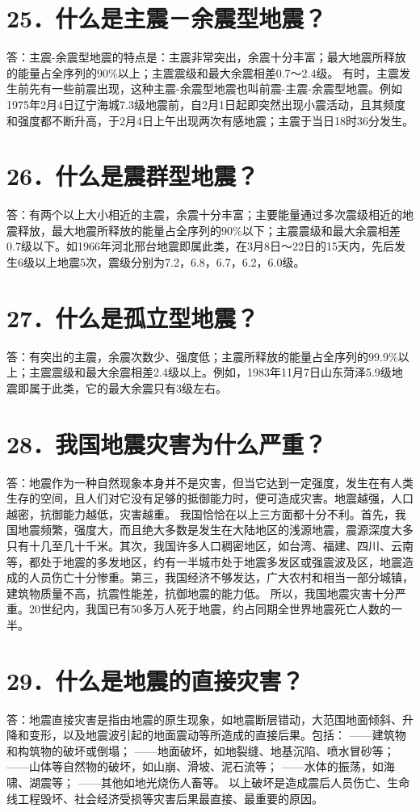 \documentclass[a4paper,12pt,english]{sphinxmanual}
\begin{document}
\section{25．什么是主震－余震型地震？}
\label{\detokenize{index:id27}}
答：主震-余震型地震的特点是：主震非常突出，余震十分丰富；最大地震所释放的能量占全序列的90\%以上；主震震级和最大余震相差0.7～2.4级。
有时，主震发生前先有一些前震出现，这种主震-余震型地震也叫前震-主震-余震型地震。例如1975年2月4日辽宁海城7.3级地震前，自2月1日起即突然出现小震活动，且其频度和强度都不断升高，于2月4日上午出现两次有感地震；主震于当日18时36分发生。


\section{26．什么是震群型地震？}
\label{\detokenize{index:id28}}
答：有两个以上大小相近的主震，余震十分丰富；主要能量通过多次震级相近的地震释放，最大地震所释放的能量占全序列的90\%以下；主震震级和最大余震相差0.7级以下。如1966年河北邢台地震即属此类，在3月8日～22日的15天内，先后发生6级以上地震5次，震级分别为7.2，6.8，6.7，6.2，6.0级。


\section{27．什么是孤立型地震？}
\label{\detokenize{index:id29}}
答：有突出的主震，余震次数少、强度低；主震所释放的能量占全序列的99.9\%以上；主震震级和最大余震相差2.4级以上。例如，1983年11月7日山东菏泽5.9级地震即属于此类，它的最大余震只有3级左右。


\section{28．我国地震灾害为什么严重？}
\label{\detokenize{index:id30}}
答：地震作为一种自然现象本身并不是灾害，但当它达到一定强度，发生在有人类生存的空间，且人们对它没有足够的抵御能力时，便可造成灾害。地震越强，人口越密，抗御能力越低，灾害越重。
我国恰恰在以上三方面都十分不利。首先，我国地震频繁，强度大，而且绝大多数是发生在大陆地区的浅源地震，震源深度大多只有十几至几十千米。其次，我国许多人口稠密地区，如台湾、福建、四川、云南等，都处于地震的多发地区，约有一半城市处于地震多发区或强震波及区，地震造成的人员伤亡十分惨重。第三，我国经济不够发达，广大农村和相当一部分城镇，建筑物质量不高，抗震性能差，抗御地震的能力低。
所以，我国地震灾害十分严重。20世纪内，我国已有50多万人死于地震，约占同期全世界地震死亡人数的一半。


\section{29．什么是地震的直接灾害？}
\label{\detokenize{index:id31}}
答：地震直接灾害是指由地震的原生现象，如地震断层错动，大范围地面倾斜、升降和变形，以及地震波引起的地面震动等所造成的直接后果。包括：
——建筑物和构筑物的破坏或倒塌；
——地面破坏，如地裂缝、地基沉陷、喷水冒砂等；
——山体等自然物的破坏，如山崩、滑坡、泥石流等；
——水体的振荡，如海啸、湖震等；
——其他如地光烧伤人畜等。
以上破坏是造成震后人员伤亡、生命线工程毁坏、社会经济受损等灾害后果最直接、最重要的原因。
\end{document}
